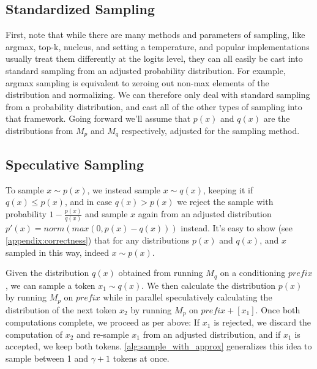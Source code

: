 \subsection{Standardized Sampling}
\label{sec:standardized_sampling}
First, note that while there are many methods and parameters of sampling, like argmax, top-k, nucleus, and setting a temperature, and popular implementations usually treat them differently at the logits level, they can all easily be cast into standard sampling from an adjusted probability distribution. For example, argmax sampling is equivalent to zeroing out non-max elements of the distribution and normalizing. We can therefore only deal with standard sampling from a probability distribution, and cast all of the other types of sampling into that framework. Going forward we'll assume that $p(x)$ and $q(x)$ are the distributions from $M_p$ and $M_q$ respectively, adjusted for the sampling method.

\subsection{Speculative Sampling}
\label{sec:speculative_sampling}
To sample $x \sim p(x)$, we instead sample $x \sim q(x)$, keeping it if $q(x) \le p(x)$, and in case $q(x) > p(x)$ we reject the sample with probability $1 - \frac{p(x)}{q(x)}$ and sample $x$ again from an adjusted distribution $p'(x) = norm(max(0, p(x) - q(x)))$ instead. It’s easy to show (see \ref{appendix:correctness}) that for any distributions $p(x)$ and $q(x)$, and $x$ sampled in this way, indeed $x \sim p(x)$.

Given the distribution $q(x)$ obtained from running $M_q$ on a conditioning $prefix$, we can sample a token $x_1 \sim q(x)$. We then calculate the distribution $p(x)$ by running $M_p$ on $prefix$ while in parallel speculatively calculating the distribution of the next token $x_2$ by running $M_p$ on $prefix + [x_1]$. Once both computations complete, we proceed as per above: If $x_1$ is rejected, we discard the computation of $x_2$ and re-sample $x_1$ from an adjusted distribution, and if $x_1$ is accepted, we keep both tokens. \ref{alg:sample_with_approx} generalizes this idea to sample between 1 and $\gamma + 1$ tokens at once.

\newcommand{\COMMENTLLAMA}[1]{{\color{darkgreen} $\triangleright$ {#1}}}

